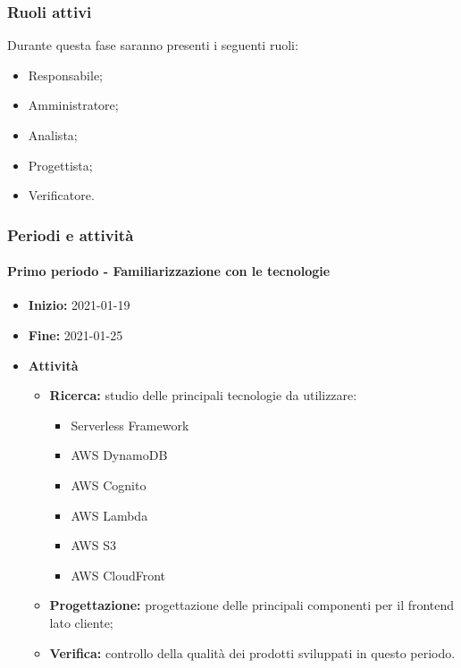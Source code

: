 \subsubsection{Ruoli attivi}
Durante questa fase saranno presenti i seguenti ruoli:
\begin{itemize}
    \item Responsabile;
    \item Amministratore;
    \item Analista;
    \item Progettista;
    \item Verificatore.
\end{itemize}

\subsubsection{Periodi e attività}

\paragraph[Secondo periodo]{Primo periodo - \textnormal{Familiarizzazione con le tecnologie}}
\begin{itemize}
    \item [] \textbf{Inizio:} 2021-01-19
    \item [] \textbf{Fine:} 2021-01-25
    \item [] \textbf{Attività}
          \begin{itemize}
              \item \textbf{Ricerca:} studio delle principali tecnologie da utilizzare:
                    \begin{itemize}
                        \item Serverless Framework
                        \item AWS DynamoDB
                        \item AWS Cognito
                        \item AWS Lambda
                        \item AWS S3
                        \item AWS CloudFront
                    \end{itemize}
              \item \textbf{Progettazione:} progettazione delle principali componenti per il frontend lato cliente;
              \item \textbf{Verifica:} controllo della qualità dei prodotti sviluppati in questo periodo.
          \end{itemize}
\end{itemize}

